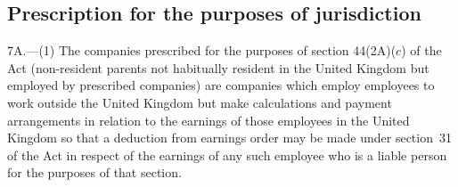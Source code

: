 \documentclass[12pt,a4paper]{article}
\begin{document}
\subsection[7A. Prescription for the purposes of jurisdiction]{Prescription for the purposes of jurisdiction}

7A.---(1)  The companies prescribed for the purposes of section 44(2A)($c$)  of the Act (non-resident parents not habitually resident in the United Kingdom but employed by prescribed companies) are companies which employ employees to work outside the United Kingdom but make calculations and payment arrangements in relation to the earnings of those employees in the United Kingdom so that a deduction from earnings order may be made under section~31 of the Act in respect of the earnings of any such employee who is a liable person for the purposes of that section.
\end{document}
